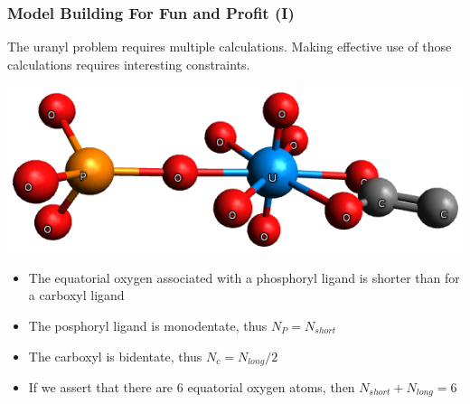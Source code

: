 \documentclass[10pt, xcolor=x11names, compress]{beamer}
\begin{document}
\begin{frame}
  \frametitle{Model Building For Fun and Profit (I)}

  The uranyl problem requires multiple {\feff} calculations.  Making
  effective use of those calculations requires interesting
  constraints.

  \begin{center}
    \quad\includegraphics[width=0.7\linewidth]{mfc/uranyl.png}
  \end{center}

  \begin{itemize}
  \item The equatorial oxygen associated with a phosphoryl ligand
    is shorter than for a carboxyl ligand
  \item The posphoryl ligand is monodentate, thus $N_P = N_{short}$
  \item The carboxyl is bidentate, thus $N_c = N_{long}/2$
  \item If we assert that there are 6 equatorial oxygen atoms,
    then $N_{short} + N_{long} = 6$
  \end{itemize}
\end{frame}
\end{document}
